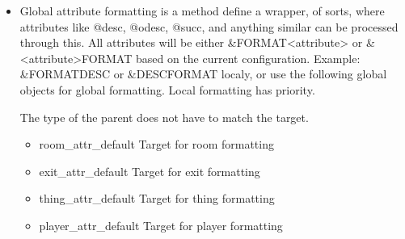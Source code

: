 \documentclass[letterpaper,10pt,english]{sphinxmanual}
\begin{document}
\begin{itemize}
\item {} 
\sphinxAtStartPar
Global attribute formatting is a method define a wrapper, of sorts,
where attributes like @desc, @odesc, @succ, and anything similar
can be processed through this.  All attributes will be either
\&FORMAT\textless{}attribute\textgreater{} or \&\textless{}attribute\textgreater{}FORMAT based on the current
configuration.  Example: \&FORMATDESC or \&DESCFORMAT localy, or
use the following global objects for global formatting.  Local
formatting has priority.

\sphinxAtStartPar
The type of the parent does not have to match the target.
\begin{itemize}
\item {} 
\sphinxAtStartPar
room\_attr\_default     \sphinxhyphen{} Target for room formatting

\item {} 
\sphinxAtStartPar
exit\_attr\_default     \sphinxhyphen{} Target for exit formatting

\item {} 
\sphinxAtStartPar
thing\_attr\_default    \sphinxhyphen{} Target for thing formatting

\item {} 
\sphinxAtStartPar
player\_attr\_default   \sphinxhyphen{} Target for player formatting

\end{itemize}

\end{itemize}
\end{document}
